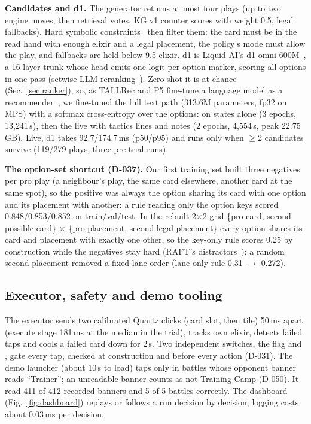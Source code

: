 \textbf{Candidates and d1.} The generator returns at most four plays (up to two engine moves, then retrieval votes, KG v1 counter scores with weight 0.5, legal fallbacks). Hard symbolic constraints~\cite{cap6938L07} then filter them: the card must be in the read hand with enough elixir and a legal placement, the policy's mode must allow the play, and fallbacks are held below 9.5 elixir. %
d1 is Liquid AI's d1-omni-600M~\cite{liquidai2026d1omni}, a 16-layer trunk whose head emits one logit per option marker, scoring all options in one pass (setwise LLM reranking~\cite{zhuang2024setwise,sun2023rankgpt,cap6938L10}). Zero-shot it is at chance (Sec.~\ref{sec:ranker}), so, as TALLRec and P5 fine-tune a language model as a recommender~\cite{bao2023tallrec,geng2022p5,lim2026l14}, we fine-tuned the full text path (313.6M parameters, fp32 on MPS) with a softmax cross-entropy over the options:  on states alone (3 epochs, 13,241\,s), then the live  with tactics lines and notes (2 epochs, 4,554\,s, peak 22.75\,GB). %
Live, d1 takes 92.7/174.7\,ms (p50/p95) and runs only when $\ge$2 candidates survive (119/279 plays, three pre-trial runs). %

\textbf{The option-set shortcut (D-037).} Our first training set built three negatives per pro play (a neighbour's play, the same card elsewhere, another card at the same spot), so the positive was always the option sharing its card with one option and its placement with another: a rule reading only the option keys scored 0.848/0.853/0.852 on train/val/test. In the rebuilt 2$\times$2 grid \{pro card, second possible card\} $\times$ \{pro placement, second legal placement\} every option shares its card and placement with exactly one other, so the key-only rule scores 0.25 by construction while the negatives stay hard (\cf RAFT's distractors~\cite{zhang2024raft,lim2026l11}); a random second placement removed a fixed lane order (lane-only rule 0.31 $\rightarrow$ 0.272). %

\subsection{Executor, safety and demo tooling}
The executor sends two calibrated Quartz clicks (card slot, then tile) 50\,ms apart (execute stage 181\,ms at the median in the trial), tracks own elixir, detects failed taps and cools a failed card down for 2\,s. Two independent switches, the  flag and , gate every tap, checked at construction and before every action (D-031). %
The demo launcher (about 10\,s to load) taps only in battles whose opponent banner reads ``Trainer''; an unreadable banner counts as not Training Camp (D-050). It read 411 of 412 recorded banners and 5 of 5 battles correctly. The dashboard (Fig.~\ref{fig:dashboard}) replays or follows a run decision by decision; logging costs about 0.03\,ms per decision. %

